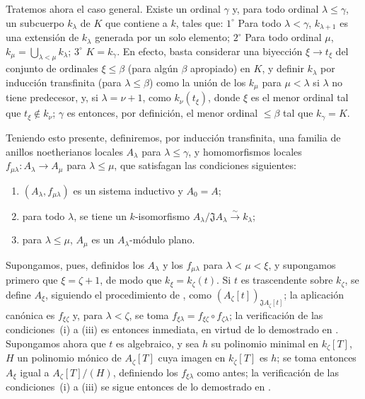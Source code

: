 \begin{env}[10.3.1.4]
\label{0.10.3.1.4}
\label{0.10.3.1.4-fr}
Tratemos ahora el caso general.
Existe un ordinal $\gamma$ y, para todo ordinal $\lambda\leq\gamma$, un subcuerpo $k_\lambda$ de $K$ que contiene a $k$, tales que: $1^\circ$ Para todo $\lambda<\gamma$,
$k_{\lambda+1}$ es una extensión de $k_\lambda$ generada por un solo elemento; $2^\circ$ Para todo ordinal $\mu$, $k_\mu=\bigcup_{\lambda<\mu}k_\lambda$;
$3^\circ$ $K=k_\gamma$.
En efecto, basta considerar una biyección $\xi\to t_\xi$ del conjunto de ordinales $\xi\leq\beta$ (para algún $\beta$ apropiado) en $K$, y definir $k_\lambda$ por inducción transfinita (para $\lambda\leq\beta$) como la unión de los $k_\mu$ para $\mu<\lambda$ si $\lambda$ no tiene predecesor, y, si $\lambda=\nu+1$, como $k_\nu(t_\xi)$, donde $\xi$ es el menor ordinal tal que $t_\xi\notin k_\nu$;
$\gamma$ es entonces, por definición, el menor ordinal $\leq\beta$ tal que $k_\gamma=K$.

Teniendo esto presente, definiremos, por inducción transfinita, una familia de anillos noetherianos locales $A_\lambda$ para $\lambda\leq\gamma$, y homomorfismos locales $f_{\mu\lambda}:A_\lambda\to A_\mu$ para $\lambda\leq\mu$, que satisfagan las condiciones siguientes:
\begin{enumerate}
  \item[(i)] $(A_\lambda,f_{\mu\lambda})$ es un sistema inductivo y $A_0=A$;
  \item[(ii)] para todo $\lambda$, se tiene un $k$-isomorfismo $A_\lambda/\mathfrak J A_\lambda\xrightarrow{\sim}k_\lambda$;
  \item[(iii)] para $\lambda\leq\mu$,
$A_\mu$ es un $A_\lambda$-módulo plano.
\end{enumerate}

Supongamos, pues, definidos los $A_\lambda$ y los $f_{\mu\lambda}$ para $\lambda<\mu<\xi$, y supongamos primero que $\xi=\zeta+1$, de modo que $k_\xi=k_\zeta(t)$.
Si $t$ es trascendente sobre $k_\zeta$, se define $A_\xi$, siguiendo el procedimiento de , como $(A_\zeta[t])_{\mathfrak J A_\zeta[t]}$;
la aplicación canónica es $f_{\xi\zeta}$ y, para $\lambda<\zeta$, se toma $f_{\xi\lambda}=f_{\xi\zeta}\circ f_{\zeta\lambda}$;
la verificación de las condiciones~(i) a (iii) es entonces inmediata, en virtud de lo demostrado en .
Supongamos ahora que $t$ es algebraico, y sea $h$ su polinomio minimal en $k_\zeta[T]$,
$H$ un polinomio mónico de $A_\zeta[T]$ cuya imagen en $k_\zeta[T]$ es $h$;
se toma entonces $A_\xi$ igual a $A_\zeta[T]/(H)$, definiendo los $f_{\xi\lambda}$ como antes;
la verificación de las condiciones~(i) a (iii) se sigue entonces de lo demostrado en .


\end{env}
